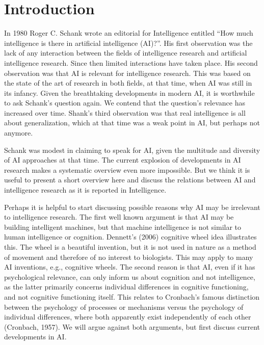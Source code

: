 \section*{Introduction}

In 1980 Roger C. Schank wrote an editorial for Intelligence entitled
``How much intelligence is there in artificial intelligence (AI)?''.
His first observation was the lack of any interaction between the fields
of intelligence research and artificial intelligence research.
Since then limited interactions have taken place.
His second observation was that AI is relevant for intelligence research.
This was based on the state of the art of research in both fields, at that
time, when AI was still in its infancy.
Given the breathtaking developments in modern AI, it is worthwhile to ask
Schank's question again.
We contend that the question's relevance has increased over time.
Shank's third observation was that real intelligence is all about
generalization, which at that time was a weak point in AI, but perhaps
not anymore.

Schank was modest in claiming to speak for AI, given the multitude and
diversity of AI approaches at that time.
The current explosion of developments in AI research makes a systematic
overview even more impossible.
But we think it is useful to present a short overview here and discuss
the relations between AI and intelligence research as it is reported
in Intelligence.

Perhaps it is helpful to start discussing possible reasons why AI may
be irrelevant to intelligence research.
The first well known argument is that AI may be building intelligent
machines, but that machine intelligence is not similar to human
intelligence or cognition.
Dennett's (2006) cognitive wheel idea illustrates this.
The wheel is a beautiful invention, but it is not used in nature as a
method of movement and therefore of no interest to biologists.
This may apply to many AI inventions, e.g., cognitive wheels.
The second reason is that AI, even if it has psychological relevance,
can only inform us about cognition and not intelligence, as the latter
primarily concerns individual differences in cognitive functioning,
and not cognitive functioning itself.
This relates to Cronbach's famous distinction between the psychology
of processes or mechanisms versus the psychology of individual
differences, where both apparently exist independently of each other
(Cronbach, 1957).
We will argue against both arguments, but first discuss current
developments in AI.
